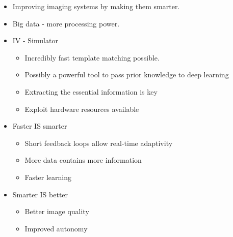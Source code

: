 \begin{itemize}
\item Improving imaging systems by making them smarter.
\item Big data - more processing power.
\item IV - Simulator
\begin{itemize}
	\item Incredibly fast template matching possible.
	\item Possibly a powerful tool to pass prior knowledge to deep learning
	\item Extracting the essential information is key 
	\item Exploit hardware resources available
\end{itemize}
\item Faster IS smarter
 \begin{itemize}
 	\item Short feedback loops allow real-time adaptivity
 	\item More data contains more information
 	\item Faster learning
 \end{itemize}
\item Smarter IS better
 \begin{itemize}
	\item Better image quality
	\item Improved autonomy
\end{itemize}
\end{itemize}




